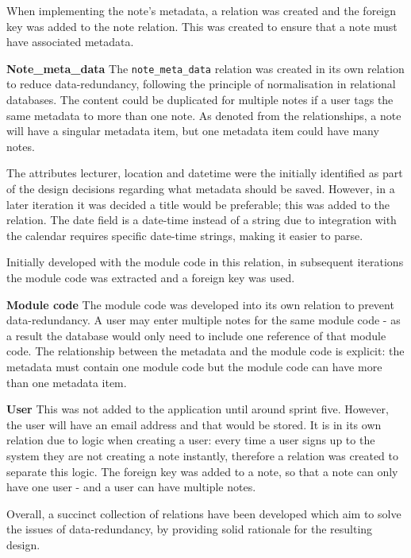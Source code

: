 When implementing the note's metadata, a relation was created and the foreign key was added to the note relation. This was created to ensure that a note must have associated metadata.

\noindent
\textbf{Note\_meta\_data}
\newline
The \texttt{note\_meta\_data} relation was created in its own relation to reduce data-redundancy, following the principle of normalisation in relational databases. The content could be duplicated for multiple notes if a user tags the same metadata to more than one note. As denoted from the relationships, a note will have a singular metadata item, but one metadata item could have many notes.

The attributes lecturer, location and datetime were the initially identified as part of the design decisions regarding what metadata should be saved. However, in a later iteration it was decided a title would be preferable; this was added to the relation. The date field is a date-time instead of a string due to integration with the calendar requires specific date-time strings, making it easier to parse.

Initially developed with the module code in this relation, in subsequent iterations the module code was extracted and a foreign key was used.

\noindent
\textbf{Module code}
\newline
The module code was developed into its own relation to prevent data-redundancy. A user may enter multiple notes for the same module code - as a result the database would only need to include one reference of that module code. The relationship between the metadata and the module code is explicit: the metadata must contain one module code but the module code can have more than one metadata item.

\noindent
\textbf{User}
\newline
This was not added to the application until around sprint five. However, the user will have an email address and that would be stored. It is in its own relation due to logic when creating a user: every time a user signs up to the system they are not creating a note instantly, therefore a relation was created to separate this logic. The foreign key was added to a note, so that a note can only have one user - and a user can have multiple notes.


\noindent
Overall, a succinct collection of relations have been developed which aim to solve the issues of data-redundancy, by providing solid rationale for the resulting design.


